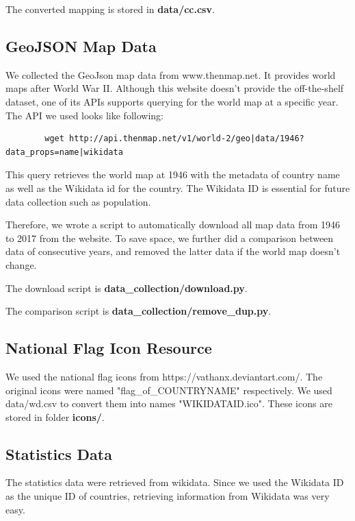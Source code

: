 \documentclass[12pt, fullpage,letterpaper]{article}
\begin{document}
        The converted mapping is stored in \textbf{data/cc.csv}.

\subsection{GeoJSON Map Data}
    We collected the GeoJson map data from www.thenmap.net.
    It provides world maps after World War II.
        Although this website doesn't provide the off-the-shelf dataset, one of its
        APIs supports querying for the world map at a specific year. The API
        we used looks like following:

        \begin{verbatim}
        wget http://api.thenmap.net/v1/world-2/geo|data/1946?data_props=name|wikidata
        \end{verbatim}

        This query retrieves the world map at 1946 with the metadata of country name as well as
        the Wikidata id for the country. The Wikidata ID is essential for future data collection
        such as population.

        Therefore, we wrote a script to automatically download all map data
        from 1946 to 2017 from the website.  To save space, we further did a
        comparison between data of consecutive years, and removed the latter
        data if the world map doesn't change.

        The download script is \textbf{data\_collection/download.py}.
        
        The comparison script is \textbf{data\_collection/remove\_dup.py}.

\subsection{National Flag Icon Resource}

    We used the national flag icons from https://vathanx.deviantart.com/.
    The original icons were named "flag\_of\_COUNTRYNAME" respectively. We used data/wd.csv
    to convert them into names "WIKIDATAID.ico". These icons are stored in folder \textbf{icons/}.


\subsection{Statistics Data}
    The statistics data were retrieved from wikidata. Since we used the Wikidata ID as the unique ID of countries,
    retrieving information from Wikidata was very easy.
\end{document}
